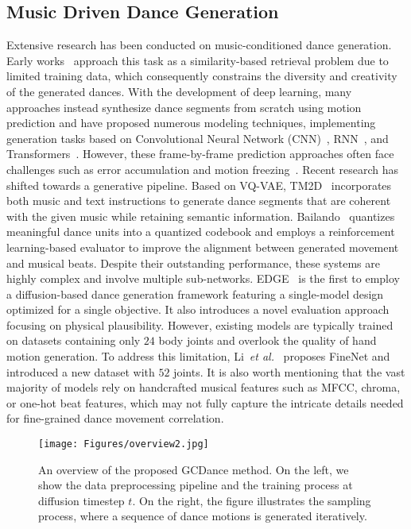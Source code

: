 \subsection{Music Driven Dance Generation}
Extensive research has been conducted on music-conditioned dance generation. Early works~\cite{shiratori2006dancing,ofli2008audio,fukayama2015music} approach this task as a similarity-based retrieval problem due to limited training data, which consequently constrains the diversity and creativity of the generated dances.
With the development of deep learning, many approaches instead synthesize dance segments from scratch using motion prediction and have proposed numerous modeling techniques, implementing generation tasks based on Convolutional Neural Network (CNN)~\cite{holden2016deep,holden2015learning}, RNN~\cite{butepage2017deep,chiu2019action,du2019bio}, and Transformers~\cite{fan2022bi,huang2022genre,li2022danceformer}. However, these frame-by-frame prediction approaches often face challenges such as error accumulation and motion freezing~\cite{zhuang2022music2dance}. Recent research has shifted towards a generative pipeline. Based on VQ-VAE, TM2D~\cite{gong2023tm2d} incorporates both music and text instructions to generate dance segments that are coherent with the given music while retaining semantic information. Bailando~\cite{siyao2022bailando} quantizes meaningful dance units into a quantized codebook and employs a reinforcement learning-based evaluator to improve the alignment between generated movement and musical beats. Despite their outstanding performance, these systems are highly complex and involve multiple sub-networks. EDGE~\cite{tseng2023edge} is the first to employ a diffusion-based dance generation framework featuring a single-model design optimized for a single objective. It also introduces a novel evaluation approach focusing on physical plausibility. However, existing models are typically trained on datasets containing only $24$ body joints and overlook the quality of hand motion generation. To address this limitation, Li~\textit{et al.}~\cite{li2023finedance} proposes FineNet and introduced a new dataset with $52$ joints. It is also worth mentioning that the vast majority of models rely on handcrafted musical features such as MFCC, chroma, or one-hot beat features, which may not fully capture the intricate details needed for fine-grained dance movement correlation.



\begin{figure*}[!t]
  \centering
  \texttt{[image: Figures/overview2.jpg]}
  \caption{An overview of the proposed GCDance method. On the left, we show the data preprocessing pipeline and the training process at diffusion timestep $t$. On the right, the figure illustrates the sampling process, where a sequence of dance motions is generated iteratively.}
  \label{f1}
\end{figure*}

